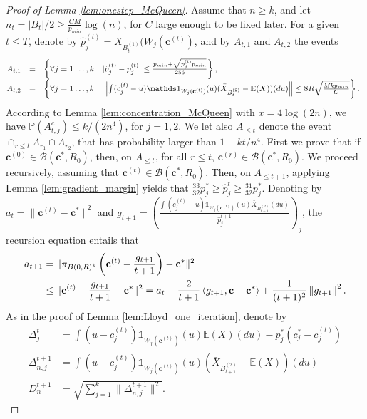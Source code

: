 \documentclass[noinfoline,preprint]{article}
\newcommand{\cb}{\mathbf{c}}
\newcommand{\E}{\mathbb{E}}
\renewcommand{\1}{\mathds 1}
\newcommand{\B}{\mathcal{B}}
\begin{document}
\begin{proof}[Proof of Lemma \ref{lem:onestep_McQueen}]
Assume that $n \geq k$, and let $n_t =|B_t|/2 \geq \frac{C M }{p_{min}} \log(n)$, for $C$ large enough to be fixed later. For a given $t \leq T$, denote by $\hat{p}_j^{(t)}= \bar{X}_{B_t^{(1)}}(W_j(\cb^{(t)})$, and by $A_{t,1}$ and $A_{t,2}$ the events
\[
\begin{array}{@{}ccl} 
A_{t,1} &=& \left \{ \forall j = 1 \hdots, k \quad  |\hat{p}_j^{(t)} - p_j^{(t)} |  \leq  \frac{p_{min} + \sqrt{p_j^{(t)}p_{min}}}{256} \right \}, \\
A_{t,2} &=& \left \{ \forall j = 1 \hdots, k \quad  \left \|\int (c_j^{(t)}-u)\1_{W_j(\cb^{(t)})}(u)(\bar{X}_{B_t^{(2)}}-\E(X))(du)  \right \|  \leq 8 R \sqrt{\frac{Mkp_{min}}{C}} \right \}.
\end{array}
\] 
According to Lemma \ref{lem:concentration_McQueen} with $x= 4 \log(2n)$, we have $\mathbb{P}(A_{t,j}^c) \leq k/(2n^4)$, for $j=1,2$. We let also $A_{\leq t}$ denote the event $\cap_{r \leq t} A_{r_1} \cap A_{r_2}$, that has probability larger than $1- kt/n^4$.  First we prove that if $\cb^{(0)} \in \B(\cb^*,R_0)$, then, on $A_{\leq t}$, for all $r \leq t$, $\cb^{(r)} \in \B(\cb^*,R_0)$. We proceed recursively, assuming that $\cb^{(t)} \in \B(\cb^*,R_0)$. Then, on $A_{\leq t+1}$, applying Lemma \ref{lem:gradient_margin} yields that $\frac{33}{32}p_j^* \geq \hat{p}_j^t \geq \frac{31}{32}p_j^*$.  Denoting by $a_t = \| \cb^{(t)} - \cb^*\|^2$ and $g_{t+1}=\left (\frac{  \int (c^{(t)}_j-u)\1_{W_j(\cb^{(t)})}(u)\bar{X}_{B^{(2)}_{t+1}}(du)}{\hat{p}_j^{t+1}} \right )_j$, the recursion equation entails that
\begin{align}\label{eq:mcqueen_onestep}
a_{t+1} & = \|\pi_{B(0,R)^k} \left ( \cb^{(t)} - \frac{g_{t+1}}{t+1} \right )- \cb^* \|^2 \notag \\
& \leq \| \cb^{(t)} - \frac{g_{t+1}}{t+1} - \cb^*  \|^2 = a_t -  \frac{2}{t+1} \left\langle g_{t+1} , \cb-\cb^* \right\rangle + \frac{1}{(t+1)^2} \left \| g_{t+1} \right \|^2. 
\end{align}
As in the proof of Lemma \ref{lem:Lloyd_one_iteration}, denote by 
\begin{align*}
\Delta^t_j & =  \int (u-c_j^{(t)})\1_{W_j(\cb^{(t)})}(u)\E(X)(du)  - p_j^*(c_j^*-c_j^{(t)})\\
\Delta^{t+1}_{n,j} & = \int(u-c_j^{(t)})\1_{W_j(\cb^{(t)})}(u)(\bar{X}_{B^{(2)}_{t+1}}-\E(X))(du) \\
D_n^{t+1} &= \sqrt{\sum_{j=1}^k \| \Delta_{n,j}^{t+1}\|^2}.
\end{align*}

\end{proof}
\end{document}
